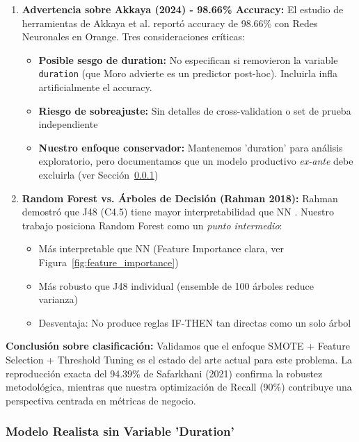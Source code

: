 \documentclass[12pt,letterpaper]{article}
\begin{document}
\begin{enumerate}
    \item \textbf{Advertencia sobre Akkaya (2024) - 98.66\% Accuracy:} El estudio de herramientas de Akkaya et al. \cite{akkaya2024} reportó accuracy de 98.66\% con Redes Neuronales en Orange. Tres consideraciones críticas:
    \begin{itemize}
        \item \textbf{Posible sesgo de \textbf{duration}:} No especifican si removieron la variable \texttt{duration} (que Moro advierte es un predictor post-hoc). Incluirla infla artificialmente el accuracy.
        \item \textbf{Riesgo de sobreajuste:} Sin detalles de cross-validation o set de prueba independiente
        \item \textbf{Nuestro enfoque conservador:} Mantenemos 'duration' para análisis exploratorio, pero documentamos que un modelo productivo \textit{ex-ante} debe excluirla (ver Sección~\ref{subsec:modelo_realista})
    \end{itemize}
    
    \item \textbf{Random Forest vs. Árboles de Decisión (Rahman 2018):} Rahman demostró que J48 (C4.5) tiene mayor interpretabilidad que NN \cite{rahman2018}. Nuestro trabajo posiciona Random Forest como un \textit{punto intermedio}:
    \begin{itemize}
        \item Más interpretable que NN (Feature Importance clara, ver Figura~\ref{fig:feature_importance})
        \item Más robusto que J48 individual (ensemble de 100 árboles reduce varianza)
        \item Desventaja: No produce reglas IF-THEN tan directas como un solo árbol
    \end{itemize}
\end{enumerate}

\textbf{Conclusión sobre clasificación:} Validamos que el enfoque SMOTE + Feature Selection + Threshold Tuning es el estado del arte actual para este problema. La reproducción exacta del 94.39\% de Safarkhani (2021) confirma la robustez metodológica, mientras que nuestra optimización de Recall (90\%) contribuye una perspectiva centrada en métricas de negocio.

\subsubsection{Modelo Realista sin Variable 'Duration'}
\label{subsec:modelo_realista}
\end{document}
